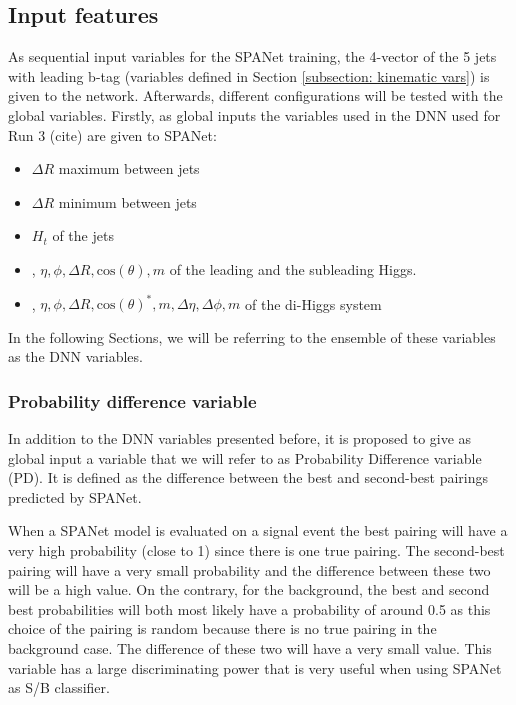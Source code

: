 \subsection{Input features}

As sequential input variables for the SPANet training, the 4-vector of the 5 jets with leading b-tag (variables defined in Section \ref{subsection: kinematic vars}) is given to the network. Afterwards, different configurations will be tested with the global variables. Firstly, as global inputs the variables used in the DNN used for Run 3 (cite) are given to SPANet:

\begin{itemize}
    \item $\Delta R$ maximum between jets
    \item $\Delta R$ minimum between jets
    \item $H_t$ of the jets
    \item \pt, $\eta, \phi, \Delta R, \text{cos}(\theta), m$ of the leading and the subleading Higgs.
    \item \pt, $\eta, \phi, \Delta R, \text{cos}(\theta)^*, m, \Delta\eta, \Delta \phi, m$ of the di-Higgs system
\end{itemize}

\noindent In the following Sections, we will be referring to the ensemble of these variables as the {DNN variables}.


\subsubsection{Probability difference variable} \label{subsubsection: PD var}

In addition to the DNN variables presented before, it is proposed to give as global input a variable that we will refer to as {Probability Difference variable} (PD). It is defined as the difference between the best and second-best pairings predicted by SPANet.

When a SPANet model is evaluated on a signal event the best pairing will have a very high probability (close to 1) since there is one true pairing. The second-best pairing will have a very small probability and the difference between these two will be a high value. On the contrary, for the background, the best and second best probabilities will both most likely have a probability of around 0.5 as this choice of the pairing is random because there is no true pairing in the background case. The difference of these two will have a very small value. This variable has a large discriminating power that is very useful when using SPANet as S/B classifier.

